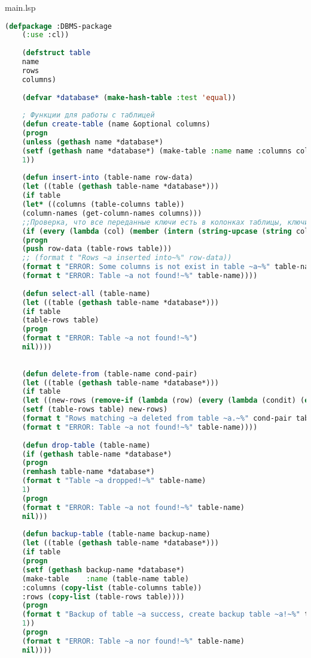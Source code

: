 
main.lsp
\begin{lstlisting}[language=Lisp]
	(defpackage :DBMS-package
	(:use :cl))
	
	(defstruct table
	name
	rows
	columns)
	
	(defvar *database* (make-hash-table :test 'equal))
	
	; Функции для работы с таблицей
	(defun create-table (name &optional columns)
	(progn
	(unless (gethash name *database*)
	(setf (gethash name *database*) (make-table :name name :columns columns :rows nil)))
	1))
	
	(defun insert-into (table-name row-data)
	(let ((table (gethash table-name *database*)))
	(if table
	(let* ((columns (table-columns table))
	(column-names (get-column-names columns)))
	;;Проверка, что все переданные ключи есть в колонках таблицы, ключи приводятся из  строкового формата в знаковый
	(if (every (lambda (col) (member (intern (string-upcase (string col))) column-names :test 'eq)) (mapcar #'car row-data))
	(progn
	(push row-data (table-rows table)))
	;; (format t "Rows ~a inserted into~%" row-data))
	(format t "ERROR: Some columns is not exist in table ~a~%" table-name)))
	(format t "ERROR: Table ~a not found!~%" table-name))))
	
	(defun select-all (table-name)
	(let ((table (gethash table-name *database*)))
	(if table
	(table-rows table)
	(progn
	(format t "ERROR: Table ~a not found!~%")
	nil))))
	
	
	(defun delete-from (table-name cond-pair)
	(let ((table (gethash table-name *database*)))
	(if table
	(let ((new-rows (remove-if (lambda (row) (every (lambda (condit) (equal (cdr condit) (cdr (assoc (car condit) row)))) cond-pair)) (table-rows table))))
	(setf (table-rows table) new-rows)
	(format t "Rows matching ~a deleted from table ~a.~%" cond-pair table-name) new-rows)
	(format t "ERROR: Table ~a not found!~%" table-name))))
	
	(defun drop-table (table-name)
	(if (gethash table-name *database*)
	(progn
	(remhash table-name *database*)
	(format t "Table ~a dropped!~%" table-name)
	1)
	(progn
	(format t "ERROR: Table ~a not found!~%" table-name)
	nil)))
	
	(defun backup-table (table-name backup-name)
	(let ((table (gethash table-name *database*)))
	(if table
	(progn
	(setf (gethash backup-name *database*)
	(make-table    :name (table-name table)
	:columns (copy-list (table-columns table))
	:rows (copy-list (table-rows table))))
	(progn
	(format t "Backup of table ~a success, create backup table ~a!~%" table-name backup-name)
	1))
	(progn
	(format t "ERROR: Table ~a nor found!~%" table-name)
	nil))))
	

\end{lstlisting}
